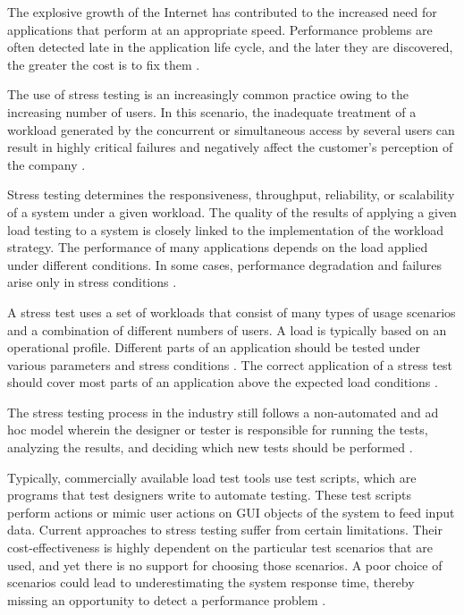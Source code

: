 \documentclass{bmcart}
\begin{document}
The explosive growth of the Internet has contributed to the increased need for applications that perform at an appropriate speed. Performance problems are often detected late in the application life cycle, and the later they are discovered, the greater the cost is to fix them \citep{Molyneaux2009}.

The use of stress testing is an increasingly common practice owing to the increasing number of users. In this scenario, the inadequate treatment of a workload generated by the concurrent or simultaneous access by several users can result in highly critical failures and negatively affect the customer's perception of the company \citep{Draheim2006b} \citep{Jiang2010}. 

Stress testing determines the responsiveness, throughput, reliability, or scalability of a system under a given workload. The quality of the results of applying a given load testing to a system is closely linked to the implementation of the workload strategy. The performance of many applications depends on the load applied under different conditions. In some cases, performance degradation and failures arise only in stress conditions \citep{Garousi2010} \citep{Jiang2010}.


A stress test uses a set of workloads that consist of many types of usage scenarios and a combination of different numbers of users. A load is typically based on an operational profile. Different parts of an application should be tested under various parameters and stress conditions \citep{Babbar2011}. The correct application of a stress test should cover most parts of an application above the expected load conditions \citep{Draheim2006b}.

The stress testing process in the industry still follows a non-automated and ad hoc model wherein the designer or tester is responsible for running the tests, analyzing the results, and deciding which new tests should be performed \citep{Lewis2005}. 

Typically, commercially available load test tools use test scripts, which are programs that test designers write to automate testing. These test scripts perform actions or mimic user actions on GUI objects of the system to feed input data. Current approaches to stress testing suffer from certain limitations. Their cost-effectiveness is highly dependent on the particular test scenarios that are used, and yet there is no support for choosing those scenarios. A poor choice of scenarios could lead to underestimating the system response time, thereby missing an opportunity to detect a performance problem \citep{Grechanik2012}.
\end{document}
